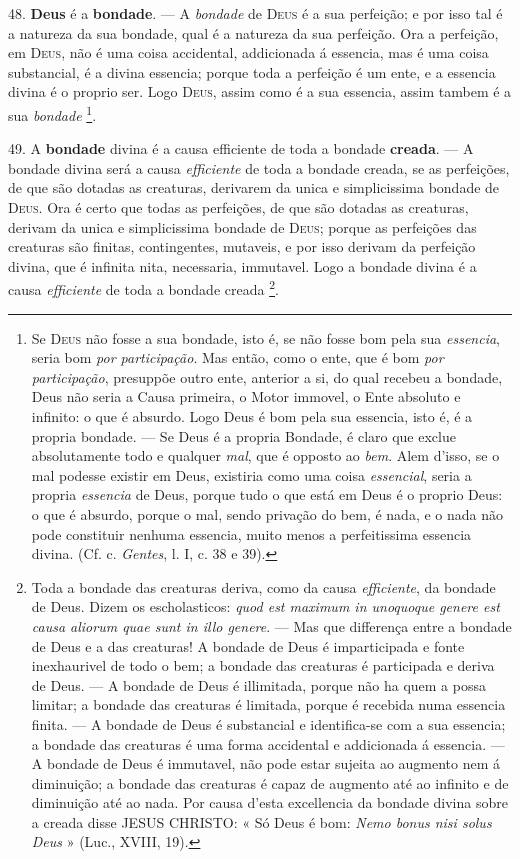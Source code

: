48. \textbf{Deus} é a \textbf{bondade}. --- A \emph{bondade} de \textsc{Deus} é a sua perfeição; e por isso tal é a natureza da sua bondade, qual é a natureza da sua perfeição. Ora a perfeição, em \textsc{Deus}, não é uma coisa accidental, addicionada á essencia, mas é uma coisa substancial, é a divina essencia; porque toda a perfeição é um ente, e a essencia divina é o proprio ser. Logo \textsc{Deus}, assim como é a sua essencia, assim tambem é a sua \emph{bondade} \footnote{Se \textsc{Deus} não fosse a sua bondade, isto é, se não fosse bom pela sua \emph{essencia}, seria bom \emph{por participação}. Mas então, como o ente, que é bom \emph{por participação}, presuppõe outro ente, anterior a si, do qual recebeu a bondade, Deus não seria a Causa primeira, o Motor immovel, o Ente absoluto e infinito: o que é absurdo. Logo Deus é bom pela sua essencia, isto é, é a propria bondade. --- Se Deus é a propria Bondade, é claro que exclue absolutamente todo e qualquer \emph{mal}, que é opposto ao \emph{bem}. Alem d'isso, se o mal podesse existir em Deus, existiria como uma coisa \emph{essencial}, seria a propria \emph{essencia} de Deus, porque tudo o que está em Deus é o proprio Deus: o que é absurdo, porque o mal, sendo privação do bem, é nada, e o nada não pode constituir nenhuma essencia, muito menos a perfeitissima essencia divina. (Cf. c. \emph{Gentes}, l. I, c. 38 e 39).}.

49. A \textbf{bondade} divina é a causa efficiente de toda a bondade \textbf{creada}. --- A bondade divina será a causa \emph{efficiente} de toda a bondade creada, se as perfeições, de que são dotadas as creaturas, derivarem da unica e simplicissima bondade de \textsc{Deus}. Ora é certo que todas as perfeições, de que são dotadas as creaturas, derivam da unica e simplicissima bondade de \textsc{Deus}; porque as perfeições das creaturas são finitas, contingentes, mutaveis, e por isso derivam da perfeição divina, que é infinita  nita, necessaria, immutavel. Logo a bondade divina é a causa \emph{efficiente} de toda a bondade creada \footnote{Toda a bondade das creaturas deriva, como da causa \emph{efficiente}, da bondade de Deus. Dizem os escholasticos: \emph{quod est maximum in unoquoque genere est causa aliorum quae sunt in illo genere}. --- Mas que differença entre a bondade de Deus e a das creaturas! A bondade de Deus é imparticipada e fonte inexhaurivel de todo o bem; a bondade das creaturas é participada e deriva de Deus. --- A bondade de Deus é illimitada, porque não ha quem a possa limitar; a bondade das creaturas é limitada, porque é recebida numa essencia finita. --- A bondade de Deus é substancial e identifica-se com a sua essencia; a bondade das creaturas é uma forma accidental e addicionada á essencia. --- A bondade de Deus é immutavel, não pode estar sujeita ao augmento nem á diminuição; a bondade das creaturas é capaz de augmento até ao infinito e de diminuição até ao nada. Por causa d'esta excellencia da bondade divina sobre a creada disse \textsc{JESUS CHRISTO}: « Só Deus é bom: \emph{Nemo bonus nisi solus Deus} » (Luc., XVIII, 19).}.

